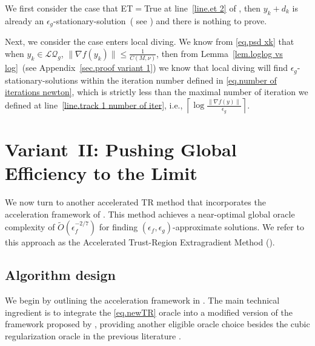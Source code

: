 \documentclass[moor,sglanonrev]{informs4}
\begin{document}
We first consider the case that ET$=$True at line~\ref{line.et 2} of , then $y_k+d_k$ is already an $\epsilon_g$-stationary-solution~({\color{red} see }) and there is nothing to prove.

Next, we consider the case  enters local diving. We know from \eqref{eq.psd xk} that when $y_k\in\mathcal{LQ}_g$, $\|\nabla f(y_k)\|\leq \frac{1}{C(M,\nu)}$, then from Lemma~\ref{lem.loglog vs log}~(see Appendix~\ref{sec.proof variant 1}) we know that local diving will find $\epsilon_g$-stationary-solutions within the iteration number defined in \eqref{eq.number of iterations newton}, which is strictly less than the maximal number of iteration we defined at line~\ref{line.track 1 number of iter}, i.e., $\left \lceil\log\frac{\|\nabla f(y)\|}{\epsilon_g} \right\rceil$.
\Halmos \endproof


\section{Variant~II: Pushing Global Efficiency to the Limit}\label{sec.second variant}
We now turn to another accelerated TR method that incorporates the acceleration framework of \citet{monteiro2013accelerated}. This method achieves a near-optimal global oracle complexity of $\tilde{O}(\epsilon_f^{-2/7})$ for finding $(\epsilon_f,\epsilon_g)$-approximate solutions. We refer to this approach as the Accelerated Trust-Region Extragradient Method ().
\subsection{Algorithm design}
We begin by outlining the acceleration framework in . The main technical ingredient is to integrate the \ref{eq.newTR} oracle into a modified version of the framework proposed by \citet{monteiro2013accelerated}, providing another eligible oracle choice besides the cubic regularization oracle in the previous literature \cite{carmon2022optimal}.
\end{document}
